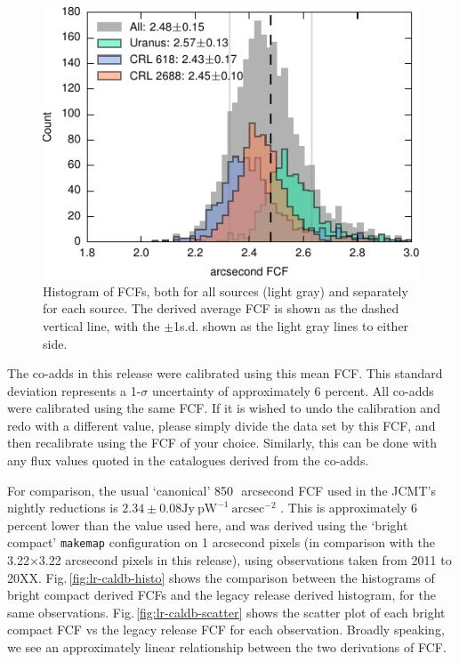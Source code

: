 \documentclass[twocolumn,times]{aastex6}
\begin{document}
\begin{figure}
  \centering
  \includegraphics{lrvalues-histo}
  \caption{Histogram of FCFs, both for all sources (light gray) and
    separately for each source. The derived average FCF is shown as
    the dashed vertical line, with the $\pm$1s.d. shown as the light
    gray lines to either side.}
  \label{fig:calibhist}
\end{figure}

The co-adds in this release were calibrated using this mean FCF.  This
standard deviation represents a 1-$\sigma$ uncertainty of
approximately 6 percent. All co-adds were calibrated using the same
FCF. If it is wished to undo the calibration and redo with a different
value, please simply divide the data set by this FCF, and then
recalibrate using the FCF of your choice. Similarly, this can be done
with any flux values quoted in the catalogues derived from the
co-adds.%

For comparison, the usual `canonical' 850\,\micron\ arcsecond FCF used
in the JCMT's nightly reductions is $2.34 \pm 0.08 \mathrm{Jy}\
\mathrm{pW}^{-1}\ \mathrm{arcsec}^{-2}$ \citep{Dempsey2013}. This is
approximately 6 percent lower than the value used here, and was
derived using the `bright compact' \texttt{makemap} configuration on 1
arcsecond pixels (in comparison with the 3.22$\times$3.22 arcsecond
pixels in this release), using observations taken from 2011 to
20XX. Fig.\,\ref{fig:lr-caldb-histo} shows the comparison between the
histograms of bright compact derived FCFs and the legacy release
derived histogram, for the same
observations. Fig.\,\ref{fig:lr-caldb-scatter} shows the scatter plot
of each bright compact FCF vs the legacy release FCF for each
observation. Broadly speaking, we see an approximately linear
relationship between the two derivations of FCF.
\end{document}
